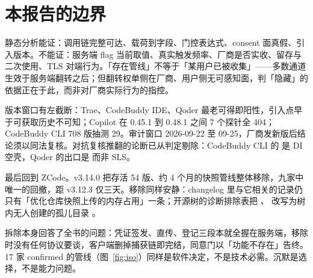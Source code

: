\section{本报告的边界}

静态分析能证：调用链完整可达、载荷到字段、门控表达式、consent 面真假、引入版本。不能证：服务端 flag 当前取值、真实触发频率、厂商是否实收、留存与二次使用、TLS 对端行为。「存在管线」不等于「某用户已被收集」——多数通道生效于服务端翻转之后；但翻转权单侧在厂商、用户侧无可感知面，判「隐藏」的依据正在于此，而非对厂商实际行为的指控。

版本窗口有左截断：Trae、CodeBuddy IDE、Qoder 最老可得即阳性，引入点早于可获取历史不可知；Copilot 在 0.45.1 到 0.48.1 之间 7 个探针全 404；CodeBuddy CLI 708 版抽测 29。审计窗口 2026-09-22 至 09-25，厂商发新版后结论须以同法复核。对抗复核推翻的论断已从判定剔除：CodeBuddy CLI 的  是 DI 空壳，Qoder  的出口是  而非 SLS。

最后回到 ZCode。v3.14.0 把存活 54 版、约 4 个月的快照管线整体移除，九家中唯一的回撤，距 v3.12.3 仅三天。移除同样安静：changelog 里与它相关的记录仍只有「优化仓库快照上传的内存占用」一条；开源树的诊断排除表把 、 改写为树内无人创建的孤儿目录 。

拆除本身回答了全书的问题：凭证签发、直传、登记三段本就全握在服务端，移除时没有任何协议要谈，客户端删掉捕获链即完结，同意门以「功能不存在」告终。17 家 confirmed 的管线（图~\ref{fig:iso}）同样是软件决定，不是技术必需。沉默是选择，不是能力问题。

